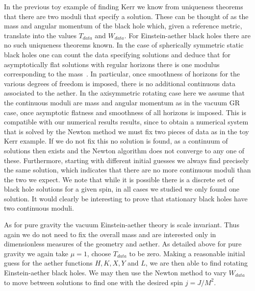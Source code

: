 \documentclass[12pt]{article}
\numberwithin{equation}{section}
\begin{document}
In the previous toy example of finding Kerr we know from uniqueness theorems that there are two moduli that specify a solution. These can be thought of as the mass and angular momentum of the black hole which, given a reference metric, translate into the values $T_{data}$ and $W_{data}$.
For Einstein-aether black holes there are no such uniqueness theorems known. In the case of spherically symmetric static black holes one can count the data specifying solutions and deduce that 
for asymptotically flat solutions with regular horizons
there is one modulus corresponding to the mass~\cite{Eling:2006ec}. In particular, once smoothness of horizons for the various degrees of freedom is imposed, there is no additional continuous data associated to the aether. In the axisymmetric rotating case here we assume that the continuous moduli are mass and angular momentum as in the vacuum GR case, once asymptotic flatness and smoothness of all horizons is imposed. This is compatible with our numerical results results, since
to obtain a numerical system that is solved by the Newton method we must fix two pieces of data as in the toy Kerr example. If we do not fix this no solution is found, as a continuum of solutions then exists and the Newton algorithm does not converge to any one of these. Furthermore, starting with different initial guesses we always find precisely the same solution, which indicates that there are no more continuous moduli than the two we expect. 
We note that while it is possible there is
a discrete set of black hole solutions for a given spin, in all cases we studied we only found one solution.
It would clearly be interesting to prove that stationary black holes have two continuous moduli. 

As for pure gravity the vacuum Einstein-aether theory is scale invariant. Thus again we do not need to fix the overall mass and are interested only in dimensionless measures of the geometry and aether.
As detailed above for pure gravity we again take $\mu = 1$, choose $T_{data}$ to be zero.
Making a reasonable initial guess for the aether functions $H, K, X, Y$ and $L$, we are then able to find rotating Einstein-aether black holes.
We may then use the Newton method to vary $W_{data}$ to move between solutions to find one with the desired spin $j = J/M^2$.
\end{document}
